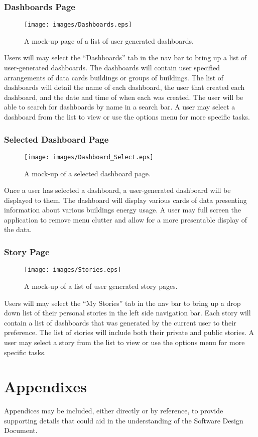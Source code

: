 \documentclass[journal,10pt,onecolumn,compsoc]{IEEEtran}
\begin{document}
	\subsubsection{Dashboards Page}
    \begin{figure}[H]
        \centering
        \texttt{[image: images/Dashboards.eps]}
        \caption{A mock-up page of a list of user generated dashboards.}
    \end{figure}
	Users will may select the ``Dashboards'' tab in the nav bar to bring up a list of user-generated dashboards.
	The dashboards will contain user specified arrangements of data cards buildings or groups of buildings. 
	The list of dashboards will detail the name of each dashboard, the user that created each dashboard, and the date and time of when each was created.
	The user will be able to search for dashboards by name in a search bar. 
	A user may select a dashboard from the list to view or use the options menu for more specific tasks.
	
    \subsubsection{Selected Dashboard Page}
    \begin{figure}[H]
        \centering
        \texttt{[image: images/Dashboard\_Select.eps]}
        \caption{A mock-up of a selected dashboard page.}
    \end{figure}
	Once a user has selected a dashboard, a user-generated dashboard will be displayed to them.
	The dashboard will display various cards of data presenting information about various buildings energy usage.
	A user may full screen the application to remove menu clutter and allow for a more presentable display of the data.
	
    \subsubsection{Story Page}
    \begin{figure}[H]
        \centering
        \texttt{[image: images/Stories.eps]}
        \caption{A mock-up of a list of user generated story pages.}
    \end{figure}
	Users will may select the ``My Stories'' tab in the nav bar to bring up a drop down list of their personal stories in the left side navigation bar.
	Each story will contain a list of dashboards that was generated by the current user to their preference. 
	The list of stories will include both their private and public stories.
	A user may select a story from the list to view or use the options menu for more specific tasks.
	
	
    \section{Appendixes}
    Appendices may be included, either directly or by reference, to provide supporting details
    that could aid in the understanding of the Software Design Document. 
    
    
\end{document}
